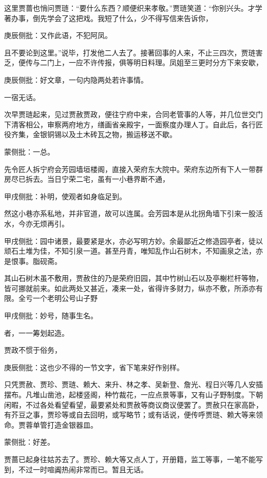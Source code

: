 \begin{parag}


    这里贾蔷也悄问贾琏：“要什么东西？顺便织来孝敬。”贾琏笑道：“你别兴头。才学著办事，倒先学会了这把戏。我短了什么，少不得写信来告诉你，\begin{note}庚辰侧批：又作此语，不犯阿凤。\end{note}且不要论到这里。”说毕，打发他二人去了。接著回事的人来，不止三四次，贾琏害乏，便传与二门上，一应不许传报，俱等明日料理。凤姐至三更时分方下来安歇，\begin{note}庚辰侧批：好文章，一句内隐两处若许事情。\end{note}一宿无话。
\end{parag}


\begin{parag}


    次早贾琏起来，见过贾赦贾政，便往宁府中来，合同老管事的人等，并几位世交门下清客相公，审察两府地方，缮画省亲殿宇，一面察度办理人丁。自此后，各行匠役齐集，金银铜锡以及土木砖瓦之物，搬运移送不歇。\begin{note}蒙侧批：一总。\end{note}先令匠人拆宁府会芳园墙垣楼阁，直接入荣府东大院中。荣府东边所有下人一带群房尽已拆去。当日宁荣二宅，虽有一小巷界断不通，\begin{note}甲戌侧批：补明，使观者如身临足到。\end{note}然这小巷亦系私地，并非官道，故可以连属。会芳园本是从北拐角墙下引来一股活水，今亦无烦再引。\begin{note}甲戌侧批：园中诸景，最要紧是水，亦必写明方妙。余最鄙近之修造园亭者，徒以顽石土堆为佳，不知引泉一道。甚至丹青，唯知乱作山石树木，不知画泉之法，亦是恨事。脂砚斋。\end{note}其山石树木虽不敷用，贾赦住的乃是荣府旧园，其中竹树山石以及亭榭栏杆等物，皆可挪就前来。如此两处又甚近，凑来一处，省得许多财力，纵亦不敷，所添亦有限。全亏一个老明公号山子野\begin{note}甲戌侧批：妙号，随事生名。\end{note}者，一一筹划起造。
\end{parag}


\begin{parag}


    贾政不惯于俗务，\begin{note}庚辰侧批：这也少不得的一节文字，省下笔来好作别样。\end{note}只凭贾赦、贾珍、贾琏、赖大、来升、林之孝、吴新登、詹光、程日兴等几人安插摆布。凡堆山凿池，起楼竖阁，种竹裁花，一应点景等事，又有山子野制度。下朝闲暇，不过各处看望看望，最要紧处和贾赦等商议商议便罢了。贾赦只在家高卧，有芥豆之事，贾珍等或自去回明，或写略节；或有话说，便传呼贾琏、赖大等来领命。贾蓉单管打造金银器皿。\begin{note}蒙侧批：好差。\end{note}贾蔷已起身往姑苏去了。贾珍、赖大等又点人丁，开册籍，监工等事，一笔不能写到，不过一时喧阗热闹非常而已。暂且无话。
\end{parag}


